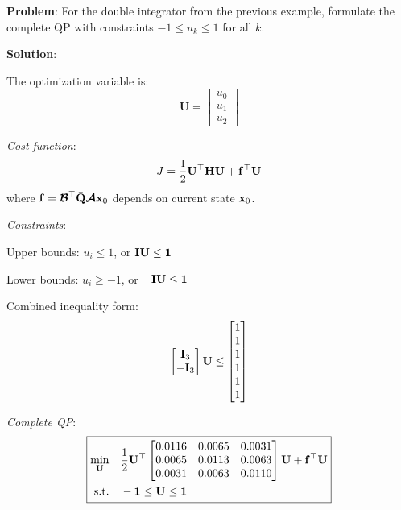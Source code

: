 \begin{examplebox}

\textbf{Problem}: For the double integrator from the previous example, formulate the complete QP with constraints $-1 \leq u_k \leq 1$ for all $k$.

\textbf{Solution}:

The optimization variable is:
\begin{equation}
    \mathbf{U} = \begin{bmatrix} u_0 \\ u_1 \\ u_2 \end{bmatrix}
\end{equation}

\textit{Cost function}:
\begin{equation}
    J = \frac{1}{2} \mathbf{U}^\top \mathbf{H} \mathbf{U} + \mathbf{f}^\top \mathbf{U}
\end{equation}
where $\mathbf{f} = \boldsymbol{\mathcal{B}}^\top \bar{\mathbf{Q}} \boldsymbol{\mathcal{A}} \mathbf{x}_0$ depends on current state $\mathbf{x}_0$.

\textit{Constraints}:

Upper bounds: $u_i \leq 1$, or $\mathbf{I} \mathbf{U} \leq \mathbf{1}$

Lower bounds: $u_i \geq -1$, or $-\mathbf{I} \mathbf{U} \leq \mathbf{1}$

Combined inequality form:
\begin{equation}
    \begin{bmatrix} \mathbf{I}_3 \\ -\mathbf{I}_3 \end{bmatrix} \mathbf{U} \leq
    \begin{bmatrix} 1 \\ 1 \\ 1 \\ 1 \\ 1 \\ 1 \end{bmatrix}
\end{equation}

\textit{Complete QP}:
\begin{equation}
\boxed{
\begin{aligned}
    \min_{\mathbf{U}} \quad & \frac{1}{2} \mathbf{U}^\top
    \begin{bmatrix} 0.0116 & 0.0065 & 0.0031 \\ 0.0065 & 0.0113 & 0.0063 \\ 0.0031 & 0.0063 & 0.0110 \end{bmatrix}
    \mathbf{U} + \mathbf{f}^\top \mathbf{U} \\
    \text{s.t.} \quad & -\mathbf{1} \leq \mathbf{U} \leq \mathbf{1}
\end{aligned}
}
\end{equation}
\end{examplebox}

